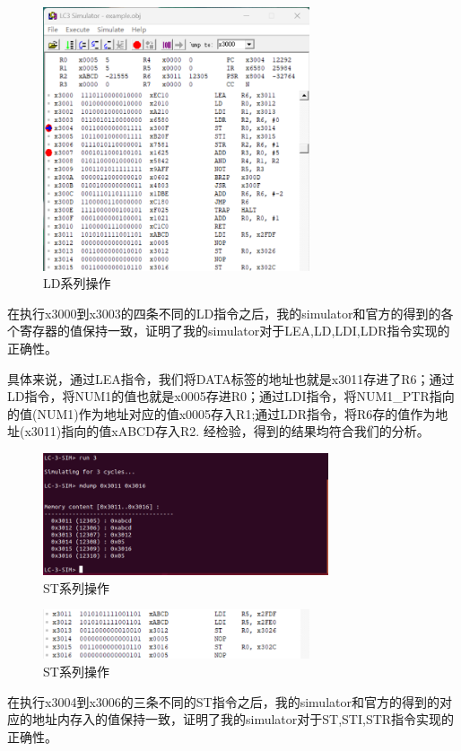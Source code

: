 \documentclass[runningheads]{llncs}
\begin{document}
\begin{figure}[H]
    \centering
    \includegraphics[width=0.7\textwidth]{3.png}
    \caption{LD系列操作}
    \label{fig:3-3}
\end{figure}
在执行x3000到x3003的四条不同的LD指令之后，我的simulator和官方的得到的各个寄存器的值保持一致，证明了我的simulator对于LEA,LD,LDI,LDR指令实现的正确性。

具体来说，通过LEA指令，我们将DATA标签的地址也就是x3011存进了R6；通过LD指令，将NUM1的值也就是x0005存进R0；通过LDI指令，将NUM1\_PTR指向的值(NUM1)作为地址对应的值x0005存入R1;通过LDR指令，将R6存的值作为地址(x3011)指向的值xABCD存入R2. 经检验，得到的结果均符合我们的分析。
\begin{figure}[H]
    \centering
    \includegraphics[width=0.75\textwidth]{4.png}
    \caption{ST系列操作}
    \label{fig:3-4}
\end{figure}
\vspace{-1cm}
\begin{figure}[H]
    \centering
    \includegraphics[width=0.7\textwidth]{5.png}
    \caption{ST系列操作}
    \label{fig:3-5}
\end{figure}
在执行x3004到x3006的三条不同的ST指令之后，我的simulator和官方的得到的对应的地址内存入的值保持一致，证明了我的simulator对于ST,STI,STR指令实现的正确性。
\end{document}
